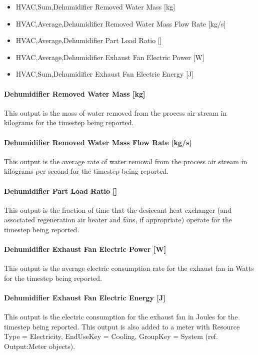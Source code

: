 \begin{itemize}
\item
  HVAC,Sum,Dehumidifier Removed Water Mass {[}kg{]}
\item
  HVAC,Average,Dehumidifier Removed Water Mass Flow Rate {[}kg/s{]}
\item
  HVAC,Average,Dehumidifier Part Load Ratio {[]}
\item
  HVAC,Average,Dehumidifier Exhaust Fan Electric Power {[}W{]}
\item
  HVAC,Sum,Dehumidifier Exhaust Fan Electric Energy {[}J{]}
\end{itemize}

\paragraph{Dehumidifier Removed Water Mass {[}kg{]}}\label{dehumidifier-removed-water-mass-kg-1}

This output is the mass of water removed from the process air stream in kilograms for the timestep being reported.

\paragraph{Dehumidifier Removed Water Mass Flow Rate {[}kg/s{]}}\label{dehumidifier-removed-water-mass-flow-rate-kgs-1}

This output is the average rate of water removal from the process air stream in kilograms per second for the timestep being reported.

\paragraph{\texorpdfstring{Dehumidifier Part Load Ratio {[]}}{Dehumidifier Part Load Ratio }}\label{dehumidifier-part-load-ratio-1}

This output is the fraction of time that the desiccant heat exchanger (and associated regeneration air heater and fans, if appropriate) operate for the timestep being reported.

\paragraph{Dehumidifier Exhaust Fan Electric Power {[}W{]}}\label{dehumidifier-exhaust-fan-electric-power-w}

This output is the average electric consumption rate for the exhaust fan in Watts for the timestep being reported.

\paragraph{Dehumidifier Exhaust Fan Electric Energy {[}J{]}}\label{dehumidifier-exhaust-fan-electric-energy-j}

This output is the electric consumption for the exhaust fan in Joules for the timestep being reported. This output is also added to a meter with Resource Type = Electricity, EndUseKey = Cooling, GroupKey = System (ref. Output:Meter objects).
